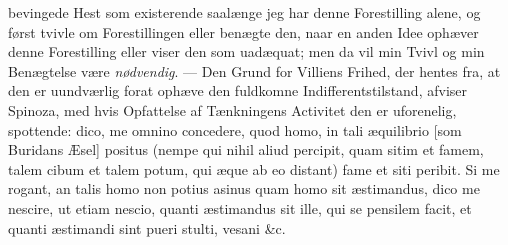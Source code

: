 \documentclass[12pt,a4paper]{book}
\begin{document}
bevingede Hest som existerende saalænge jeg har denne Forestilling
alene, og først tvivle om Forestillingen eller benægte den, naar en
anden Idee ophæver denne Forestilling eller viser den som uadæquat;
men da vil min Tvivl og min Benægtelse være \emph{nødvendig}. --- Den Grund
for Villiens Frihed, der hentes fra, at den er uundværlig forat
ophæve den fuldkomne Indifferentstilstand, afviser Spinoza, med hvis
Opfattelse af Tænkningens Activitet den er uforenelig, spottende:
dico, me omnino concedere, quod homo, in tali æquilibrio [som
Buridans Æsel] positus (nempe qui nihil aliud percipit, quam sitim
et famem, talem cibum et talem potum, qui æque ab eo distant) fame
et siti peribit. Si me rogant, an talis homo non potius asinus quam
homo sit æstimandus, dico me nescire, ut etiam nescio, quanti
æstimandus sit ille, qui se pensilem facit, et quanti æstimandi sint
pueri stulti, vesani \&c.
\end{document}
